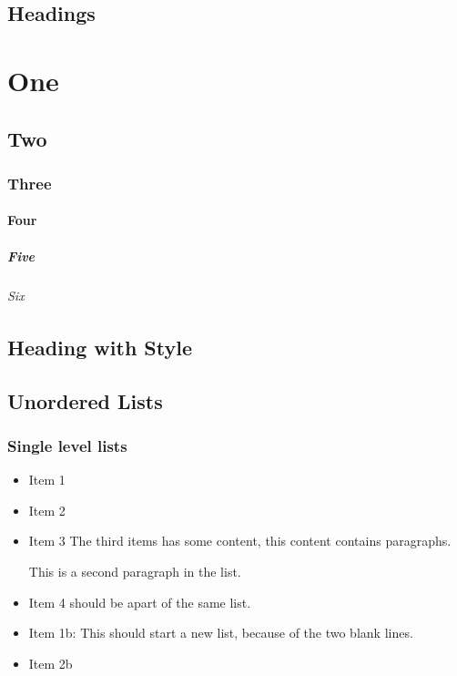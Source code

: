 \section{\label{headings}Headings}
\chapter{\label{one}One}
\section{\label{two}Two}
\subsection{\label{three}Three}
\subsubsection{\label{four}Four}
\paragraph{\label{five}Five}
\subparagraph{\label{six}Six}
\section{\label{heading-with-style}Heading with Style}
\section{\label{unordered-lists}Unordered Lists}
\subsection{\label{single-level-lists}Single level lists}
\begin{itemize}
\item
\par Item 1 \item
\par Item 2 \item
\par Item 3 The third items has some content, this content contains paragraphs.
\par This is a second paragraph in the list.
\par \item
\par Item 4 should be apart of the same list.
\end{itemize}
\begin{itemize}
\item
\par Item 1b: This should start a new list, because of the two blank lines. \item
\par Item 2b
\end{itemize}
